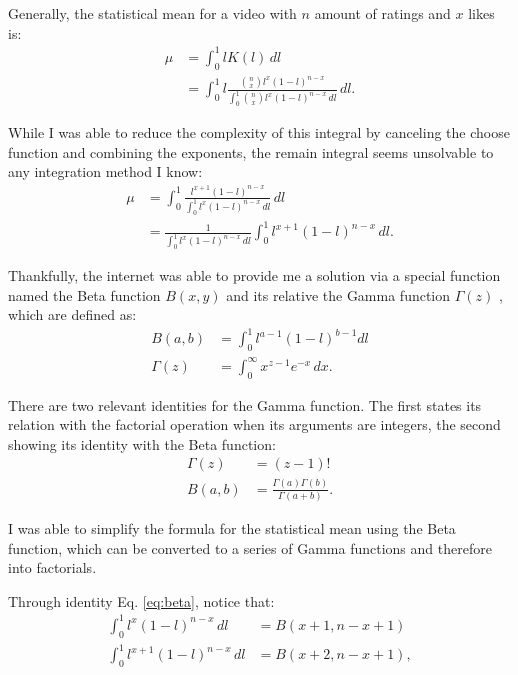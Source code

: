 \documentclass[a4paper,11pt]{article}
\begin{document}
Generally, the statistical mean for a video with $n$ amount of ratings and $x$ likes is:
\begin{align*}
    \mu &=\int_{0}^{1} l K(l) \, dl\\
    &=\int_{0}^{1} l \frac{ {n \choose x} l^x (1-l)^{n-x}} {\int_{0}^{1} {n \choose x} l^x (1-l)^{n-x} \, dl} \, dl.
\end{align*}

While I was able to reduce the complexity of this integral by canceling the choose function and combining the exponents, the remain integral seems unsolvable to any integration method I know:
\begin{align*}
    \mu &= \int_{0}^{1} \frac{ l^{x+1} (1-l)^{n-x}} {\int_{0}^{1} l^x (1-l)^{n-x} \, dl} \, dl\\
    &= \frac{1}{\int_{0}^{1} l^x (1-l)^{n-x} \, dl} \int_{0}^{1}  l^{x+1} (1-l)^{n-x} \, dl.
\end{align*}

Thankfully, the internet was able to provide me a solution via a special function named the Beta function $B(x,y)$ \parencite{wikipedia_2021} and its relative the Gamma function $\Gamma(z)$ \parencite{artin_2006}, which are defined as:
\begin{align}
    B(a, b) &= \int_{0}^{1} l^{a-1} (1-l)^{b-1} dl\label{eq:beta}\\
    \Gamma(z) &= \int_{0}^{\infty} x^{z-1} e^{-x} \, dx.\label{eq:gammma}
\end{align}

There are two relevant identities for the Gamma function. The first states its relation with the factorial operation when its arguments are integers, the second showing its identity with the Beta function:
\begin{align}
    \Gamma(z) &= (z-1)! \label{eq:gammaident}\\
    B(a, b) &= \frac{\Gamma(a) \Gamma(b)}{\Gamma(a + b)} \label{eq:betaident}.
\end{align}

I was able to simplify the formula for the statistical mean using the Beta function, which can be converted to a series of Gamma functions and therefore into factorials.

Through identity Eq. \ref{eq:beta}, notice that:
\begin{align*}
    \int_{0}^{1} l^x (1-l)^{n-x} \, dl &= B(x+1, n-x+1)\\
    \int_{0}^{1}  l^{x+1} (1-l)^{n-x} \, dl &= B(x+2, n-x+1),
\end{align*}
\end{document}
